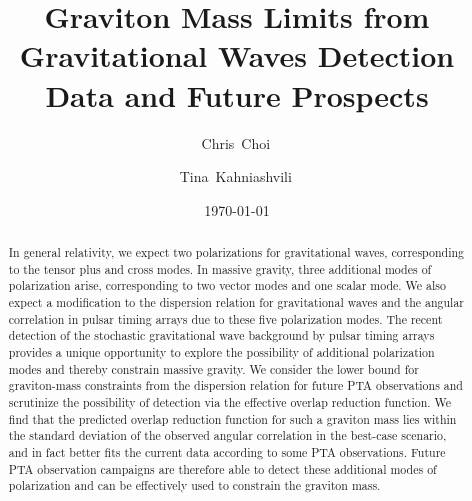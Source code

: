 \documentclass[prd,aps,psfig,nofootinbib,nobibnotes,superscriptaddress,preprintnumbers,times]{revtex4-2}\setlength{\topmargin}{-14mm}
\begin{document}
\title{Graviton Mass Limits from Gravitational Waves Detection Data and Future Prospects}

\date{\today}

\author{Chris~Choi\,}

\author{Tina~Kahniashvili\,}


\begin{abstract}
In general relativity, we expect two polarizations for gravitational waves, corresponding to the tensor plus and cross modes. In massive gravity, three additional modes of polarization arise, corresponding to two vector modes and one scalar mode. We also expect a modification to the dispersion relation for gravitational waves and the angular correlation in pulsar timing arrays due to these five polarization modes. The recent detection of the stochastic gravitational wave background by pulsar timing arrays provides a unique opportunity to explore the possibility of additional polarization modes and thereby constrain massive gravity. We consider the lower bound for graviton-mass constraints from the dispersion relation for future PTA observations and scrutinize the possibility of detection via the effective overlap reduction function. We find that the predicted overlap reduction function for such a graviton mass lies within the standard deviation of the observed angular correlation in the best-case scenario, and in fact better fits the current data according to some PTA observations. Future PTA observation campaigns are therefore able to detect these additional modes of polarization and can be effectively used to constrain the graviton mass. 

\end{abstract}
\end{document}
